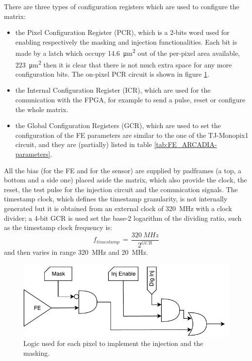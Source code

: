         There are three types of configuration registers which are used to configure the matrix: 
        \begin{itemize}
            \item the Pixel Configuration Register (PCR), which is a 2-bits word used for enabling respectively the masking and injection functionalities. Each bit is made by a latch which occupy \SI{14.6}{\um\squared} out of the per-pixel area available, \SI{223}{\um\squared} then it is clear that there is not much extra space for any more configuration bits. The on-pixel PCR circuit is shown in figure \ref{fig:pixel_cfg}.
            \item the Internal Configuration Register (ICR), which are used for the comunication with the FPGA, for example to send a pulse, reset or configure the whole matrix.
            \item the Global Configuration Registers (GCR), which are used to set the configuration of the FE parameters are similar to the one of the TJ-Monopix1 circuit, and they are (partially) listed in table \ref{tab:FE_ARCADIA-parameters}.
        \end{itemize}
        All the bias (for the FE and for the sensor) are supplied by padframes (a top, a bottom and a side one) placed aside the matrix, which also provide the clock, the reset, the test pulse for the injection circuit and the comunication signals.
        The timestamp clock, which defines the timestamp granularity, is not internally generated but it is obtained from an external clock of \SI{320}{MHz} with a clock divider; a 4-bit GCR is used set the base-2 logarithm of the dividing ratio, such as the timestamp clock frequency is:
        \begin{equation}
            f_{timestamp}\, =\, \frac{\SI{320}{MHz}}{2^{GCR}}
        \end{equation}
        and then varies in range \SI{320}{MHz} and \SI{20}{MHz}.\\
        \begin{figure}[h!]
            \centering
            \includegraphics[width=.55\linewidth]{figures/ARCADIA/pixel_cfg.pdf}
            \caption{Logic used for each pixel to implement the injection and the masking.}
            \label{fig:pixel_cfg}
        \end{figure}    
